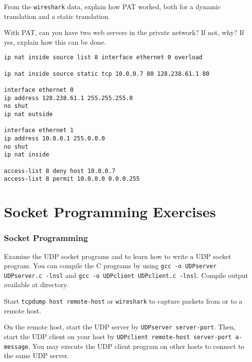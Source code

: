 \documentclass{../UTNetLab}
\begin{document}
    \begin{report}
    \item From the \lstinline{wireshark} data, explain how PAT worked, both for a dynamic translation and a static translation.
    
    \item With PAT, can you have two web servers in the private network?
    If not, why?
    If yes, explain how this can be done.
    \end{report}

    \begin{lstlisting}[language={cisco}, caption={PAT Router Configuration in Fig. 8.7}]
ip nat inside source list 8 interface ethernet 0 overload

ip nat inside source static tcp 10.0.0.7 80 128.238.61.1 80

interface ethernet 0
ip address 128.238.61.1 255.255.255.0
no shut
ip nat outside

interface ethernet 1
ip address 10.0.0.1 255.0.0.0
no shut
ip nat inside

access-list 8 deny host 10.0.0.7
access-list 8 permit 10.0.0.0 0.0.0.255
    \end{lstlisting}

\part{Socket Programming Exercises}
\section{Socket Programming}
    Examine the UDP socket programs  and  to learn how to write a UDP socket program.
    You can compile the C programs by using \lstinline{gcc -o UDPserver UDPserver.c -lnsl} and \lstinline{gcc -o UDPclient UDPclient.c -lnsl}. Compile output available at  directory.

    Start \lstinline[emph={your-host, remote-host}]{tcpdump host remote-host} or \lstinline{wireshark} to capture packets from or to a remote host. 

    On the remote host, start the UDP server by \lstinline[emph={server-port}]{UDPserver server-port}.
    Then, start the UDP client on your host by \lstinline[emph={your-host, remote-host, server-port, a-message}]{UDPclient remote-host server-port a-message}.
    You may execute the UDP client program on other hosts to connect to the same UDP server.
\end{document}

